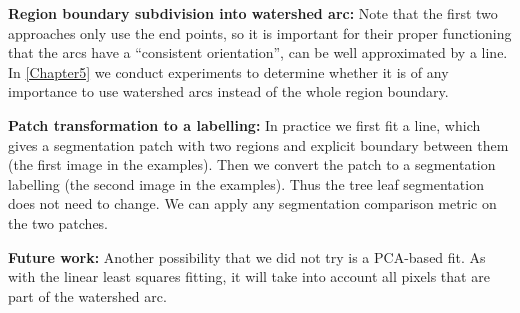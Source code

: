 \textbf{Region boundary subdivision into watershed arc:} Note that the first two approaches only use the end points, so it is important for their proper functioning that the arcs have a ``consistent orientation'', \ie  can be well approximated by a line. %
In \cref{Chapter5} we conduct experiments to determine whether it is of any importance to use watershed arcs instead of the whole region boundary.

\textbf{Patch transformation to a labelling:} In practice we first fit a line, which gives a segmentation patch with two regions and explicit boundary between them (the first image in the examples). Then we convert the patch to a segmentation labelling (the second image in the examples). Thus the tree leaf segmentation does not need to change. We can apply any segmentation comparison metric on the two patches.

\textbf{Future work:} Another possibility that we did not try is a PCA-based fit. As with the linear least squares fitting, it will take into account all pixels that are part of the watershed arc.

